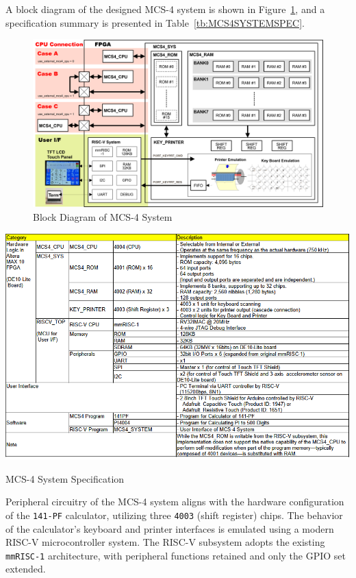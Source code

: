 A block diagram of the designed MCS-4 system is shown in Figure~\ref{fig:MCS4SYSTEMBLOCKDAGRAM}, and a specification summary is presented in Table~\ref{tb:MCS4SYSTEMSPEC}.

\begin{figure}[htbp]
  \centering
  \includegraphics[width=1.0\textwidth]{./Figure/MCS4SystemBlockDiagram.png}
  \caption{Block Diagram of MCS-4 System}
  \label{fig:MCS4SYSTEMBLOCKDAGRAM}
\end{figure}
\begin{table}[htbp]
    \includegraphics[width=1.00\columnwidth]{./Table/MCS4SystemSpec.png}
    \caption{MCS-4 System Specification}
    \label{tb:MCS4SYSTEMSPEC}
\end{table}

Peripheral circuitry of the MCS-4 system aligns with the hardware configuration of the \texttt{141-PF} calculator, utilizing three \texttt{4003} (shift register) chips. The behavior of the calculator's keyboard and printer interfaces is emulated using a modern RISC-V microcontroller system. The RISC-V subsystem adopts the existing \texttt{mmRISC-1} architecture, with peripheral functions retained and only the GPIO set extended\cite{mmRISC-1}.

